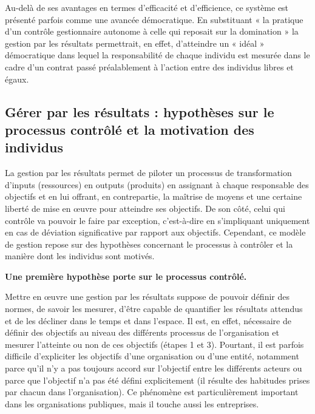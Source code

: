 \documentclass[oneside]{kaobook}
\begin{document}
Au-delà de ses avantages en termes d’efficacité et d’efficience, ce système est présenté parfois comme une avancée démocratique. En substituant « la pratique d’un contrôle gestionnaire autonome à celle qui reposait sur la domination » la gestion par les résultats permettrait, en effet, d’atteindre un « idéal » démocratique dans lequel la responsabilité de chaque individu est mesurée dans le cadre d’un contrat passé préalablement à l’action entre des individus libres et égaux. 
\subsection{Gérer par les résultats : hypothèses sur le processus contrôlé et la motivation des individus}
\label{sec:orga5565c2}
La gestion par les résultats permet de piloter un processus de transformation d’inputs (ressources) en outputs (produits) en assignant à chaque responsable des objectifs et en lui offrant, en contrepartie, la maîtrise de moyens et une certaine liberté de mise en œuvre pour atteindre ses objectifs. De son côté, celui qui contrôle va pouvoir le faire par exception, c’est-à-dire en s’impliquant uniquement en cas de déviation significative par rapport aux objectifs. Cependant, ce modèle de gestion repose sur des hypothèses concernant le processus à contrôler et la manière dont les individus sont motivés.

\textbf{Une première hypothèse porte sur le processus contrôlé.}

Mettre en œuvre une gestion par les résultats suppose de pouvoir définir des normes, de savoir les mesurer, d’être capable de quantifier les résultats attendus et de les décliner dans le temps et dans l’espace. Il est, en effet, nécessaire de définir des objectifs au niveau des différents processus de l’organisation et mesurer l’atteinte ou non de ces objectifs (étapes 1 et 3). Pourtant, il est parfois difficile d’expliciter les objectifs d’une organisation ou d’une entité, notamment parce qu’il n’y a pas toujours accord sur l’objectif entre les différents acteurs ou parce que l’objectif n’a pas été défini explicitement (il résulte des habitudes prises par chacun dans l’organisation). Ce phénomène est particulièrement important dans les organisations publiques, mais il touche aussi les entreprises.
\end{document}
